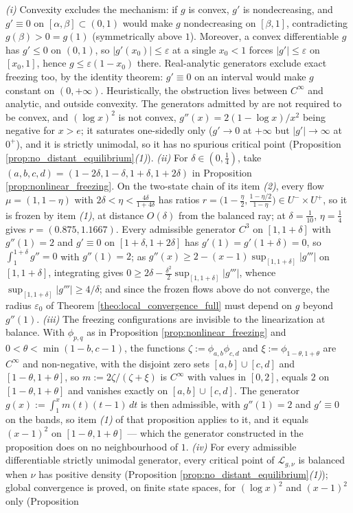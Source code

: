 \begin{remark}\label{rem:freezing}
\emph{(i)} Convexity excludes the mechanism: if $g$ is convex, $g'$ is nondecreasing, and $g'\equiv0$ on $[\alpha,\beta]\subset(0,1)$ would make $g$ nondecreasing on $[\beta,1]$, contradicting $g(\beta)>0=g(1)$ (symmetrically above $1$). Moreover, a convex differentiable $g$ has $g'\leq0$ on $(0,1)$, so $|g'(x_0)|\leq\varepsilon$ at a single $x_0<1$ forces $|g'|\leq\varepsilon$ on $[x_0,1]$, hence $g\leq\varepsilon(1-x_0)$ there. Real-analytic generators exclude exact freezing too, by the identity theorem: $g'\equiv0$ on an interval would make $g$ constant on $(0,+\infty)$. Heuristically, the obstruction lives between $C^\infty$ and analytic, and outside convexity. The generators admitted by \citet{brunswic2024theory} are not required to be convex, and $(\log x)^2$ is not convex, $g''(x)=2(1-\log x)/x^2$ being negative for $x>e$; it saturates one-sidedly only ($g'\rightarrow0$ at $+\infty$ but $|g'|\rightarrow\infty$ at $0^+$), and it is strictly unimodal, so it has no spurious critical point (Proposition \ref{prop:no_distant_equilibrium}\emph{(1)}). \emph{(ii)} For $\delta\in(0,\frac14)$, take $(a,b,c,d)=(1-2\delta,1-\delta,1+\delta,1+2\delta)$ in Proposition \ref{prop:nonlinear_freezing}. On the two-state chain of its item \emph{(2)}, every flow $\mu=(1,1-\eta)$ with $2\delta<\eta<\frac{4\delta}{1+4\delta}$ has ratios $r=\bigl(1-\frac\eta2,\frac{1-\eta/2}{1-\eta}\bigr)\in U^-\times U^+$, so it is frozen by item \emph{(1)}, at distance $O(\delta)$ from the balanced ray; at $\delta=\frac1{10}$, $\eta=\frac14$ gives $r=(0.875,1.1667)$. Every admissible generator $C^3$ on $[1,1+\delta]$ with $g''(1)=2$ and $g'\equiv0$ on $[1+\delta,1+2\delta]$ has $g'(1)=g'(1+\delta)=0$, so $\int_1^{1+\delta}g''=0$ with $g''(1)=2$; as $g''(x)\geq2-(x-1)\sup_{[1,1+\delta]}|g'''|$ on $[1,1+\delta]$, integrating gives $0\geq2\delta-\frac{\delta^2}2\sup_{[1,1+\delta]}|g'''|$, whence $\sup_{[1,1+\delta]}|g'''|\geq4/\delta$; and since the frozen flows above do not converge, the radius $\varepsilon_0$ of Theorem \ref{theo:local_convergence_full} must depend on $g$ beyond $g''(1)$. \emph{(iii)} The freezing configurations are invisible to the linearization at balance. With $\phi_{p,q}$ as in Proposition \ref{prop:nonlinear_freezing} and $0<\theta<\min(1-b,c-1)$, the functions $\zeta:=\phi_{a,b}\phi_{c,d}$ and $\xi:=\phi_{1-\theta,1+\theta}$ are $C^\infty$ and non-negative, with the disjoint zero sets $[a,b]\cup[c,d]$ and $[1-\theta,1+\theta]$, so $m:=2\zeta/(\zeta+\xi)$ is $C^\infty$ with values in $[0,2]$, equals $2$ on $[1-\theta,1+\theta]$ and vanishes exactly on $[a,b]\cup[c,d]$. The generator $g(x):=\int_1^xm(t)(t-1)\,dt$ is then admissible, with $g''(1)=2$ and $g'\equiv0$ on the bands, so item \emph{(1)} of that proposition applies to it, and it equals $(x-1)^2$ on $[1-\theta,1+\theta]$ --- which the generator constructed in the proposition does on no neighbourhood of $1$. \emph{(iv)} For every admissible differentiable strictly unimodal generator, every critical point of $\mathcal L_{g,\nu}$ is balanced when $\nu$ has positive density (Proposition \ref{prop:no_distant_equilibrium}\emph{(1)}); global convergence is proved, on finite state spaces, for $(\log x)^2$ and $(x-1)^2$ only (Proposition 
\end{remark}
